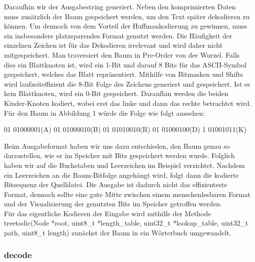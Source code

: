 \documentclass[course=erap]{aspdoc}
\begin{document}
Daraufhin wir der Ausgabestring generiert. Neben den komprimierten Daten muss zusätzlich der Baum gespeichert werden, um den Text später dekodieren zu können. Um dennoch von dem Vorteil der Huffmankodierung zu gewinnen, muss ein insbesondere platzsparendes Format genutzt werden. Die Häufigkeit der einzelnen Zeichen ist für das Dekodieren irrelevant und wird daher nicht mitgespeichert.
Man traversiert den Baum in Pre-Order von der Wurzel. Falls dies ein Blattknoten ist, wird ein 1-Bit und darauf 8 Bits für das ASCII-Symbol gespeichert, welches das Blatt repräsentiert. Mithilfe von Bitmasken und Shifts wird laufzeiteffizient die 8-Bit Folge des Zeichens generiert und gespeichert. Ist es kein Blattknoten, wird ein 0-Bit gespeichert. Daraufhin werden die beiden Kinder-Knoten kodiert, wobei erst das linke und dann das rechte betrachtet wird.
Für den Baum in Abbildung 1 würde die Folge wie folgt aussehen:

\begin{center}
    01 01000001(A) 01 01000010(B) 01 01010010(R) 01 01000100(D) 1 01001011(K)
\end{center}
Beim Ausgabeformat haben wir uns dazu entschieden, den Baum genau so darzustellen, wie er im Speicher mit Bits gespeichert werden wurde. Folglich haben wir auf die Buchstaben und Leerzeichen im Beispiel verzichtet. Nachdem ein Leerzeichen an die Baum-Bitfolge angehängt wird, folgt dann die kodierte Bitsequenz der Quelldatei. Die Ausgabe ist dadurch nicht das effizienteste Format, dennoch sollte eine gute Mitte zwischen einem menschenlesbaren Format und der Visualisierung der genutzten Bits im Speicher getroffen werden.\\
Für das eigentliche Kodieren der Eingabe wird mithilfe der Methode tree\textunderscore to\textunderscore dic(Node *root, uint8_t *length_table, uint32_t *lookup_table, uint32_t path, uint8_t length) zunächst der Baum in ein Wörterbuch umgewandelt.



\subsubsection{decode}
\end{document}
